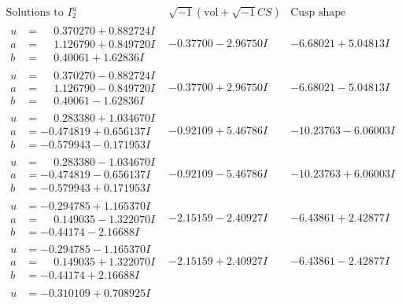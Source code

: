 \documentclass[1p]{elsarticle_modified}
\theoremstyle{definition}
\newcommand{\I}{\sqrt{-1}}
\begin{document}
$$\begin{array}{c|c|c}  
\text{Solutions to }I^u_{2}& \I (\text{vol} + \sqrt{-1}CS) & \text{Cusp shape}\\
 \hline 
\begin{aligned}
u &= \phantom{-}0.370270 + 0.882724 I \\
a &= \phantom{-}1.126790 + 0.849720 I \\
b &= \phantom{-}0.40061 + 1.62836 I\end{aligned}
 & -0.37700 - 2.96750 I & -6.68021 + 5.04813 I \\ \hline\begin{aligned}
u &= \phantom{-}0.370270 - 0.882724 I \\
a &= \phantom{-}1.126790 - 0.849720 I \\
b &= \phantom{-}0.40061 - 1.62836 I\end{aligned}
 & -0.37700 + 2.96750 I & -6.68021 - 5.04813 I \\ \hline\begin{aligned}
u &= \phantom{-}0.283380 + 1.034670 I \\
a &= -0.474819 + 0.656137 I \\
b &= -0.579943 - 0.171953 I\end{aligned}
 & -0.92109 + 5.46786 I & -10.23763 - 6.06003 I \\ \hline\begin{aligned}
u &= \phantom{-}0.283380 - 1.034670 I \\
a &= -0.474819 - 0.656137 I \\
b &= -0.579943 + 0.171953 I\end{aligned}
 & -0.92109 - 5.46786 I & -10.23763 + 6.06003 I \\ \hline\begin{aligned}
u &= -0.294785 + 1.165370 I \\
a &= \phantom{-}0.149035 - 1.322070 I \\
b &= -0.44174 - 2.16688 I\end{aligned}
 & -2.15159 - 2.40927 I & -6.43861 + 2.42877 I \\ \hline\begin{aligned}
u &= -0.294785 - 1.165370 I \\
a &= \phantom{-}0.149035 + 1.322070 I \\
b &= -0.44174 + 2.16688 I\end{aligned}
 & -2.15159 + 2.40927 I & -6.43861 - 2.42877 I \\ \hline\begin{aligned}
u &= -0.310109 + 0.708925 I \\

\end{aligned}
\end{array}$$
\end{document}
